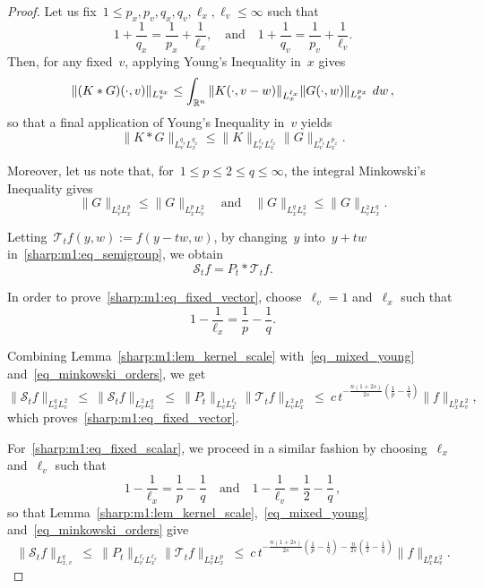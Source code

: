 \documentclass[leqno,10pt]{amsart}
\theoremstyle{plain}
\theoremstyle{remark}
\numberwithin{equation}{section}
\def\dw{\,{\rm d}w}
\def\ern{\mathbb{R}^n}
\begin{document}
{\begin{proof}
Let us fix~$1\leq p_x,p_v,q_x,q_v,\ell_x,\ell_v\leq\infty$ such that
\begin{equation}
\label{sharp:m1:eq_young_rel}
1+\frac{1}{q_x}=\frac{1}{p_x}+\frac{1}{\ell_x},
\quad \text{and} \quad 
1+\frac{1}{q_v}=\frac{1}{p_v}+\frac{1}{\ell_v}.
\end{equation}
Then, for any fixed~$v$, applying Young's Inequality in~$x$ gives
\[
\|(K*G)(\cdot,v)\|_{L^{q_x}_x}
\leq
\int_{\ern}\|K(\cdot,v-w)\|_{L^{\ell_x}_x}\|G(\cdot,w)\|_{L^{p_x}_x}\,\dw\,,
\]
so that a final application of Young's Inequality in~$v$ yields
\begin{equation}
\label{eq_mixed_young}
\|K*G\|_{L^{q_v}_vL^{q_x}_x}
\leq
\|K\|_{L^{\ell_v}_vL^{\ell_x}_x}
\|G\|_{L^{p_v}_vL^{p_x}_x}.
\end{equation}

Moreover, let us note that, for~$1\leq p\leq2\leq q\leq\infty$, the integral Minkowski's Inequality gives
\begin{equation}
\label{eq_minkowski_orders}
\|G\|_{L^2_vL^p_x}
\leq\|G\|_{L^p_xL^2_v}
\quad \text{and} \quad
\|G\|_{L^q_xL^2_v}
\leq\|G\|_{L^2_vL^q_x}.
\end{equation}

Letting~$\mathscr{T}_tf(y,w) := f(y-tw,w)$, by changing~$y$ into~$y+tw$ in~\eqref{sharp:m1:eq_semigroup}, we obtain
\begin{equation}
\label{sharp:m1:eq_ordinary_conv}
\mathscr{S}_t f=P_t*\mathscr{T}_tf.
\end{equation}


In order to prove~\eqref{sharp:m1:eq_fixed_vector}, choose~$\ell_v=1$ and~$\ell_x$ such that
\[
1-\frac{1}{\ell_x}=\frac{1}{p}-\frac{1}{q}.
\]

Combining Lemma~\ref{sharp:m1:lem_kernel_scale} with~\eqref{eq_mixed_young} and~\eqref{eq_minkowski_orders}, we get
\[
\|\mathscr{S}_tf\|_{L^q_xL^2_v} \ \leq \ \|\mathscr{S}_tf\|_{L^2_vL^q_x}  \ \leq \ \|P_t\|_{L^1_vL^{\ell_x}_x}
\|\mathscr{T}_tf\|_{L^2_vL^p_x}\ \leq \ c\, t^{-\frac{n(1+2s)}{2s}(\frac{1}{p}-\frac{1}{q})}
\|f\|_{L^p_xL^2_v},
\]
which proves~\eqref{sharp:m1:eq_fixed_vector}.

For~\eqref{sharp:m1:eq_fixed_scalar}, we proceed in a similar fashion by choosing~$\ell_x$ and~$\ell_v$ such that
\[
1-\frac{1}{\ell_x}=\frac{1}{p}-\frac{1}{q}
\quad \text{and} \quad 1-\frac{1}{\ell_v} = \frac{1}{2}-\frac{1}{q}\,,
\]
 so that Lemma~\ref{sharp:m1:lem_kernel_scale},~\eqref{eq_mixed_young} and~\eqref{eq_minkowski_orders} give
\[
\|\mathscr{S}_tf\|_{L^q_{x,v}} \ \leq \ \|P_t\|_{L^{\ell_v}_vL^{\ell_x}_x}\|\mathscr{T}_tf\|_{L^2_vL^p_x} \ \leq \ 
c\,t^{-\frac{n(1+2s)}{2s}\left(\frac{1}{p}-\frac{1}{q}\right)
-
\frac{n}{2s}\left(\frac{1}{2}-\frac{1}{q}\right)}\|f\|_{L^p_xL^2_v}.
\]
\end{proof}

}
\end{document}
